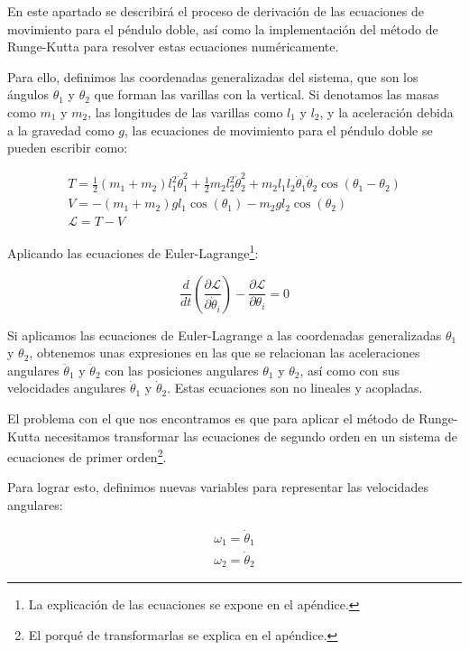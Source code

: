\documentclass[10pt,onecolumn]{article}
\begin{document}
En este apartado se describirá el proceso de derivación de las ecuaciones de movimiento para el péndulo doble, así como la implementación del método de Runge-Kutta para resolver estas ecuaciones numéricamente.

Para ello, definimos las coordenadas generalizadas del sistema, que son los ángulos $\theta_1$ y $\theta_2$ que forman las varillas con la vertical. Si denotamos las masas como $m_1$ y $m_2$, las longitudes de las varillas como $l_1$ y $l_2$, y la aceleración debida a la gravedad como $g$, las ecuaciones de movimiento para el péndulo doble se pueden escribir como:


\begin{align}
        T = \frac{1}{2} (m_1+m_2) l_1^2 \dot{\theta}_1^2 + \frac{1}{2} m_2  l_2^2 \dot{\theta}_2^2 + m_2l_1 l_2 \dot{\theta}_1 \dot{\theta}_2 \cos(\theta_1 - \theta_2) \\
         V = -(m_1+m_2) g l_1 \cos(\theta_1) - m_2 g l_2 \cos(\theta_2) \\
        \mathcal{L} = T - V 
\end{align}




Aplicando las ecuaciones de Euler-Lagrange\footnote{La explicación de las ecuaciones se expone en el apéndice.}:

\begin{equation}
\dfrac{d}{dt} \left( \dfrac{\partial \mathcal{L}}{\partial \dot{\theta}_i} \right) - \dfrac{\partial \mathcal{L}}{\partial \theta_i} = 0
\end{equation} 

Si aplicamos las ecuaciones de Euler-Lagrange a las coordenadas generalizadas $\theta_1$ y $\theta_2$, obtenemos unas expresiones en las que se relacionan las aceleraciones angulares $\ddot{\theta}_1$ y $\ddot{\theta}_2$ con las posiciones angulares $\theta_1$ y $\theta_2$, así como con sus velocidades angulares $\dot{\theta}_1$ y $\dot{\theta}_2$. Estas ecuaciones son no lineales y acopladas. 

El problema con el que nos encontramos es que para aplicar el método de Runge-Kutta necesitamos transformar las ecuaciones de segundo orden en un sistema de ecuaciones de primer orden\footnote{El porqué de transformarlas se explica en el apéndice.}.

Para lograr esto, definimos nuevas variables para representar las velocidades angulares:

\begin{align}
\omega_1 = \dot{\theta}_1 \\
\omega_2 = \dot{\theta}_2
\end{align}
\end{document}
